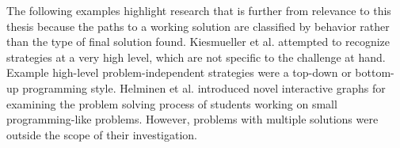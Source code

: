 The following examples highlight research that is further from relevance to this thesis because the paths to a working solution are classified by behavior rather than the type of final solution found. Kiesmueller et al. \cite{Kiesmueller} attempted to recognize strategies at a very high level, which are not specific to the challenge at hand. Example high-level problem-independent strategies were a top-down or bottom-up programming style. Helminen et al. \cite{ICERHelminen} introduced novel interactive graphs for examining the problem solving process of students working on small programming-like problems. However, problems with multiple solutions were outside the scope of their investigation.



%
%





%
%
%


